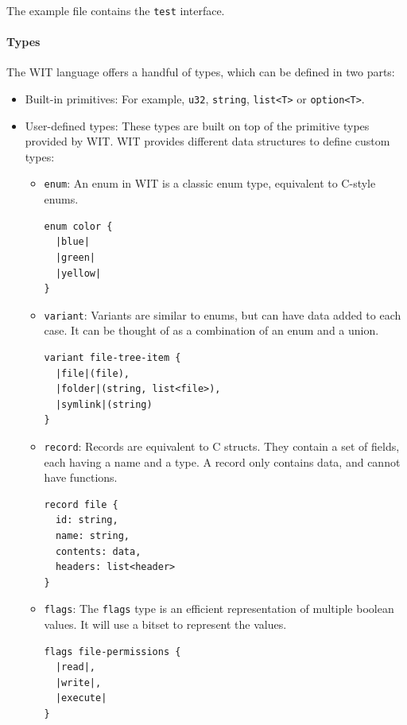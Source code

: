 The example file contains the \texttt{test} interface.

\paragraph{Types}
The WIT language offers a handful of types, which can be defined in two parts:
\begin{itemize}
\item Built-in primitives: For example, \texttt{u32}, \texttt{string}, \texttt{list<T>} or \texttt{option<T>}.
\item User-defined types: These types are built on top of the primitive types provided by WIT. WIT provides different data structures to define custom types:
\begin{itemize}
\item \texttt{enum}: An enum in WIT is a classic enum type, equivalent to C-style enums.
\begin{lstlisting}[language=wit]
enum color {
  |blue|
  |green|
  |yellow|
}
\end{lstlisting}

\item \texttt{variant}: Variants are similar to enums, but can have data added to each case. It can be thought of as a combination of an enum and a union.
\begin{lstlisting}[language=wit]
variant file-tree-item {
  |file|(file),
  |folder|(string, list<file>),
  |symlink|(string)
}
\end{lstlisting}

\item \texttt{record}: Records are equivalent to C structs. They contain a set of fields, each having a name and a type. A record only contains data, and cannot have functions.
\begin{lstlisting}[language=wit]
record file {
  id: string,
  name: string,
  contents: data,
  headers: list<header>
}
\end{lstlisting}

\item \texttt{flags}: The \texttt{flags} type is an efficient representation of multiple boolean values. It will use a bitset to represent the values.

\begin{lstlisting}[language=wit]
flags file-permissions {
  |read|,
  |write|,
  |execute|
}
\end{lstlisting}

\end{itemize}
\end{itemize}


